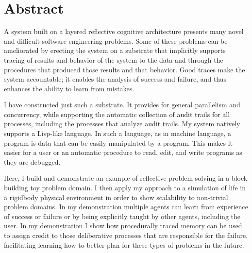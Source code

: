 \begingroup
\let\clearpage\relax
\let\cleardoublepage\relax
\let\cleardoublepage\relax

\chapter*{Abstract}

A system built on a layered reflective cognitive architecture presents
many novel and difficult software engineering problems.  Some of these
problems can be ameliorated by erecting the system on a substrate that
implicitly supports tracing of results and behavior of the system to
the data and through the procedures that produced those results and
that behavior.  Good traces make the system accountable; it enables
the analysis of success and failure, and thus enhances the ability to
learn from mistakes.

I have constructed just such a substrate.  It provides for general
parallelism and concurrency, while supporting the automatic collection
of audit trails for all processes, including the processes that
analyze audit trails.  My system natively supports a Lisp-like
language.  In such a language, as in machine language, a program is
data that can be easily manipulated by a program.  This makes it
easier for a user or an automatic procedure to read, edit, and write
programs as they are debugged.

Here, I build and demonstrate an example of reflective problem solving
in a block building toy problem domain.  I then apply my approach to a
simulation of life in a rigidbody physical environment in order to
show scalability to non-trivial problem domains.  In my demonstration
multiple agents can learn from experience of success or failure or by
being explicitly taught by other agents, including the user.  In my
demonstration I show how procedurally traced memory can be used to
assign credit to those deliberative processes that are responsible for
the failure, facilitating learning how to better plan for these types
of problems in the future.

\endgroup

\vfill

